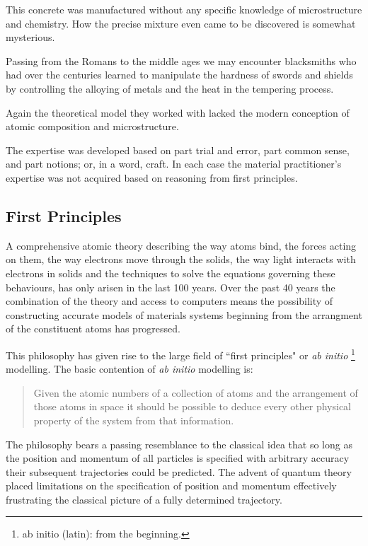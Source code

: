 This concrete was manufactured without any specific knowledge of microstructure and 
chemistry. How the precise mixture even came to be discovered is somewhat mysterious.

Passing from the Romans to the middle ages we may encounter blacksmiths 
who had over the centuries learned to manipulate the hardness of swords 
and shields by controlling the alloying of metals and the 
heat in the tempering process. 

Again the theoretical model they worked with 
lacked the modern conception of atomic composition 
and microstructure.

%
The expertise was developed based on part trial and error, 
part common sense, and part notions; or, in a word, craft.
%
In each case the material practitioner's expertise 
was not acquired based on reasoning from first principles.

\subsection{First Principles}

A comprehensive atomic theory describing the way atoms bind, the forces acting on them, 
the way electrons move through the solids, the way light interacts with electrons in solids
and the techniques to solve the equations governing these behaviours, has only 
arisen in the last 100 years. 
%
Over the past 40 years the combination of the theory and access to computers 
means the possibility of constructing accurate models of materials 
systems beginning from the arrangment of the constituent atoms has
progressed. 
%

This philosophy has given rise to the large field of ``first principles" or {\it ab initio} 
\footnote{ab initio (latin): from the beginning.} modelling. 
%
The basic contention of {\it ab initio} modelling is:  

\begin{quote}
Given the atomic numbers of a collection of atoms 
and the arrangement of those atoms in space 
it should be possible to deduce every other 
physical property of the system from that information.
\end{quote}

The philosophy bears a passing resemblance to the classical idea
that so long as the position and momentum of all particles 
is specified with arbitrary accuracy their subsequent 
trajectories could be predicted. The advent of quantum theory
placed limitations on the specification of position and momentum
effectively frustrating the classical picture of a fully determined
trajectory. 

